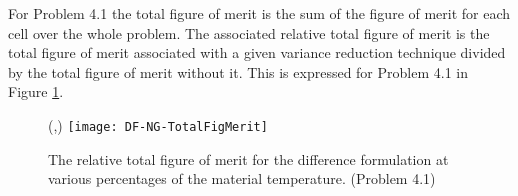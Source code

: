 % 
% 		

	For Problem 4.1 the total figure of merit is the sum of the figure of merit for each cell over the whole problem. The associated relative total figure of merit is the total figure of merit associated with a given variance reduction technique divided by the total figure of merit without it. This is expressed for Problem 4.1 in Figure \ref{fig:DF-NG-TotalFigMerit}.

\begin{figure}[htbp]
	\begin{center}
		\begin{minipage}[t]{6in}
		\centering
		\begin{picture}(\width,\height)
	                {\texttt{[image: DF-NG-TotalFigMerit]}}
		\end{picture}
		\caption{\label{fig:DF-NG-TotalFigMerit} The relative total figure of merit for the difference formulation at various percentages of the material temperature. (Problem 4.1)}
		\end{minipage} %
	\end{center}
\end{figure}

